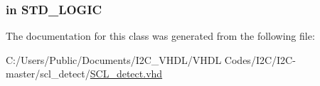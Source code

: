 \subsubsection[{\texorpdfstring{S\+T\+D\+\_\+\+L\+O\+G\+I\+C\+\_\+1164}{STD_LOGIC_1164}}]{\hspace{0.3cm}{\ttfamily [Package]}}\hypertarget{class_s_c_l__detect_aa4b2b25246a821511120e3149b003563}{}\label{class_s_c_l__detect_aa4b2b25246a821511120e3149b003563}
\subsubsection[{\texorpdfstring{sync\+\_\+rst}{sync_rst}}]{ {\bfseries \textcolor{vhdlchar}{in}\textcolor{vhdlchar}{ }} {\bfseries \textcolor{vhdlchar}{S\+T\+D\+\_\+\+L\+O\+G\+IC}\textcolor{vhdlchar}{ }} \hspace{0.3cm}{\ttfamily [Port]}}\hypertarget{class_s_c_l__detect_a3495b88db081463071853b171449fc35}{}\label{class_s_c_l__detect_a3495b88db081463071853b171449fc35}


The documentation for this class was generated from the following file\+:\begin{DoxyCompactItemize}
\item 
C\+:/\+Users/\+Public/\+Documents/\+I2\+C\+\_\+\+V\+H\+D\+L/\+V\+H\+D\+L Codes/\+I2\+C/\+I2\+C-\/master/scl\+\_\+detect/\hyperlink{_s_c_l__detect_8vhd}{S\+C\+L\+\_\+detect.\+vhd}\end{DoxyCompactItemize}
